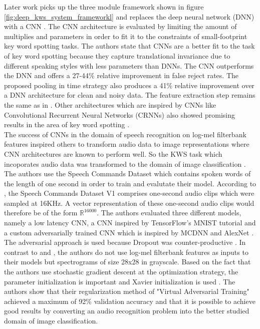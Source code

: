 \documentclass{article}
\theoremstyle{definition}
\theoremstyle{remark}
\begin{document}
Later work picks up the three module framework shown in figure \ref{fig:deep_kws_system_frameworkl} and replaces the deep neural network (DNN) with a CNN \cite{sainath2015convolutional}. The CNN architecture is evaluated by limiting the amount of multiplies and parameters in order to fit it to the constraints of small-footprint key word spotting tasks. The authors state that CNNs are a better fit to the task of key word spotting because they capture translational invariance due to different speaking styles with less parameters than DNNs. The CNN outperforms the DNN and offers a 27-44\% relative improvement in false reject rates. The proposed pooling in time strategy also produces a 41\% relative improvement over a DNN architecture for clean and noisy data. The feature extraction step remains the same as in \cite{chen2014small}. Other architectures which are inspired by CNNs like Convolutional Recurrent Neural Networks (CRNNs) also showed promising results in the area of key word spotting \cite{arik2017convolutional}.\\

The success of CNNs in the domain of speech recognition on log-mel filterbank features inspired others to transform audio data to image representations where CNN architectures are known to perform well. So the KWS task which incoporates audio data was transformed to the domain of image classification \cite{gouda2018speech}. The authors use the Speech Commands Dataset \cite{warden2018speech} which contains spoken words of the length of one second in order to train and evalutate their model. According to \cite{warden2018speech}, the Speech Commands Dataset V1 \cite{scd_v1} comprises one-second audio clips which were sampled at 16KHz. A vector representation of these one-second audio clips would therefore be of the form  $\mathbb{R}^{16000}$. The authors evaluated three different models, namely a low latency CNN, a CNN inspired by TensorFlow's MNIST tutorial and a custom adversarially trained CNN which is inspired by MCDNN \cite{cirecsan2012multi} and AlexNet \cite{krizhevsky2012imagenet}. The adversarial approach is used because Dropout was counter-productive \cite{goodfellow2016deep}. In contrast to \cite{chen2014small} and \cite{sainath2015convolutional}, the authors do not use log-mel filterbank features as inputs to their models but spectrograms of size 28x28 in grayscale. Based on the fact that the authors use stochastic gradient descent at the optimization strategy, the parameter initialization is important and Xavier initialization is used \cite{glorot2010understanding}. The authors show that their regularization method of "Virtual Adversarial Training" achieved a maximum of 92\% validation accuracy and that it is possible to achieve good results by converting an audio recognition problem into the better studied domain of image classification.\\
\end{document}
